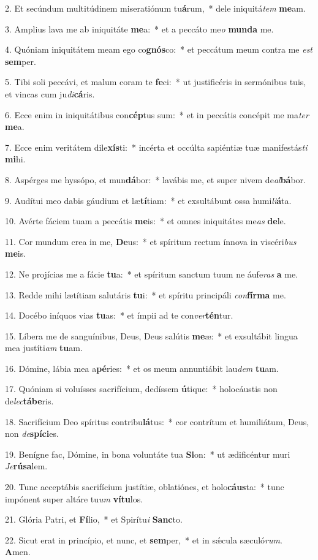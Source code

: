2. Et secúndum multitúdinem miseratiónum tu\textbf{á}rum,~*  dele iniquitá\textit{tem} \textbf{me}am.\

3. Amplius lava me ab iniquitáte \textbf{me}a:~*  et a peccáto me\textit{o} \textbf{mun}\textbf{da} me.\

4. Quóniam iniquitátem meam ego co\textbf{gnós}co:~*  et peccátum meum contra me \textit{est} \textbf{sem}per.\

5. Tibi soli peccávi, et malum coram te \textbf{fe}ci:~*  ut justificéris in sermónibus tuis, et vincas cum ju\textit{di}\textbf{cá}ris.\

6. Ecce enim in iniquitátibus con\textbf{cép}tus sum:~*  et in peccátis concépit me ma\textit{ter} \textbf{me}a.\

7. Ecce enim veritátem dile\textbf{xís}ti:~*  incérta et occúlta sapiéntiæ tuæ manifestás\textit{ti} \textbf{mi}hi.\

8. Aspérges me hyssópo, et mun\textbf{dá}bor:~*  lavábis me, et super nivem de\textit{al}\textbf{bá}bor.\

9. Audítui meo dabis gáudium et læ\textbf{tí}tiam:~*  et exsultábunt ossa humi\textit{li}\textbf{á}ta.\

10. Avérte fáciem tuam a peccátis \textbf{me}is:~*  et omnes iniquitátes me\textit{as} \textbf{de}le.\

11. Cor mundum crea in me, \textbf{De}us:~*  et spíritum rectum ínnova in viscéri\textit{bus} \textbf{me}is.\

12. Ne projícias me a fácie \textbf{tu}a:~*  et spíritum sanctum tuum ne áufe\textit{ras} \textbf{a} me.\

13. Redde mihi lætítiam salutáris \textbf{tu}i:~*  et spíritu principáli \textit{con}\textbf{fír}\textbf{ma} me.\

14. Docébo iníquos vias \textbf{tu}as:~*  et ímpii ad te con\textit{ver}\textbf{tén}tur.\

15. Líbera me de sanguínibus, Deus, Deus salútis \textbf{me}æ:~*  et exsultábit lingua mea justíti\textit{am} \textbf{tu}am.\

16. Dómine, lábia mea a\textbf{pé}ries:~*  et os meum annuntiábit lau\textit{dem} \textbf{tu}am.\

17. Quóniam si voluísses sacrifícium, dedíssem \textbf{ú}tique:~*  holocáustis non de\textit{lec}\textbf{tá}\textbf{be}ris.\

18. Sacrifícium Deo spíritus contribu\textbf{lá}tus:~*  cor contrítum et humiliátum, Deus, non \textit{de}\textbf{spí}\textbf{ci}es.\

19. Benígne fac, Dómine, in bona voluntáte tua \textbf{Si}on:~*  ut ædificéntur muri \textit{Je}\textbf{rú}\textbf{sa}lem.\

20. Tunc acceptábis sacrifícium justítiæ, oblatiónes, et holo\textbf{cáus}ta:~*  tunc impónent super altáre tu\textit{um} \textbf{ví}\textbf{tu}los.\

21. Glória Patri, et \textbf{Fí}lio,~*  et Spirítu\textit{i} \textbf{Sanc}to.\

22. Sicut erat in princípio, et nunc, et \textbf{sem}per,~*  et in sǽcula sæculó\textit{rum}. \textbf{A}men.\

